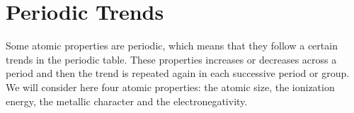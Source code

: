 \documentclass[main.tex]{subfiles}
\begin{document}
\begin{description}
%
%





\end{description}
\newpage
\section{Periodic Trends}
Some atomic properties are periodic, which means that they follow a certain trends in the periodic table. These properties increases or decreases across a period and then the trend is repeated again in each successive period or group. We will consider here four atomic properties: the atomic size, the ionization energy, the metallic character and the electronegativity.
\end{document}
